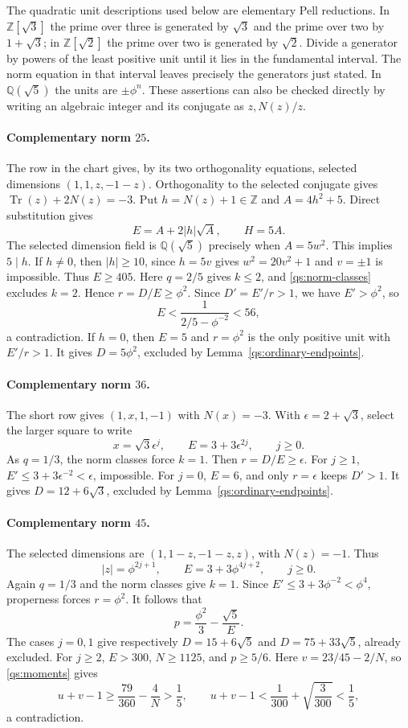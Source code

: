 \documentclass[11pt,a4paper]{article}
\theoremstyle{definition}\newtheorem{definition}[theorem]{Definition}
\theoremstyle{remark}\newtheorem{remark}[theorem]{Remark}
\newcommand{\Q}{\mathbb Q}
\newcommand{\ZZ}{\mathbb Z}
\numberwithin{equation}{section}
\begin{document}
The quadratic unit descriptions used below are elementary Pell
reductions. In $\ZZ[\sqrt3]$ the prime over three is generated by
$\sqrt3$ and the prime over two by $1+\sqrt3$; in
$\ZZ[\sqrt2]$ the prime over two is generated by $\sqrt2$.
Divide a generator by powers of the least positive unit until it lies
in the fundamental interval. The norm equation in that interval leaves
precisely the generators just stated. In $\Q(\sqrt5)$ the units
are $\pm\phi^n$. These assertions can also be checked directly by
writing an algebraic integer and its conjugate as $z,N(z)/z$.

\paragraph{Complementary norm $25$.}
The row in the chart gives, by its two orthogonality equations,
selected dimensions $(1,1,z,-1-z)$. Orthogonality to the selected
conjugate gives $\operatorname{Tr}(z)+2N(z)=-3$. Put
$h=N(z)+1\in\ZZ$ and $A=4h^2+5$. Direct substitution gives
\[
 E=A+2|h|\sqrt A,\qquad H=5A.
\]
The selected dimension field is $\Q(\sqrt5)$ precisely when
$A=5w^2$. This implies $5\mid h$. If $h\ne0$, then $|h|\ge10$,
since $h=5v$ gives $w^2=20v^2+1$ and $v=\pm1$ is impossible.
Thus $E\ge405$. Here $q=2/5$ gives $k\le2$, and
\eqref{qs:norm-classes} excludes $k=2$. Hence $r=D/E\ge\phi^2$.
Since $D'=E'/r>1$, we have $E'>\phi^2$, so
\[
 E<\frac1{2/5-\phi^{-2}}<56,
\]
a contradiction. If $h=0$, then $E=5$ and $r=\phi^2$ is the only
positive unit with $E'/r>1$. It gives $D=5\phi^2$, excluded by
Lemma~\ref{qs:ordinary-endpoints}.

\paragraph{Complementary norm $36$.}
The short row gives $(1,x,1,-1)$ with $N(x)=-3$.
With $\epsilon=2+\sqrt3$, select the larger square to write
\[
 x=\sqrt3\epsilon^j,\qquad E=3+3\epsilon^{2j},\qquad j\ge0.
\]
As $q=1/3$, the norm classes force $k=1$. Then $r=D/E\ge\epsilon$.
For $j\ge1$, $E'\le3+3\epsilon^{-2}<\epsilon$, impossible.
For $j=0$, $E=6$, and only $r=\epsilon$ keeps $D'>1$.
It gives $D=12+6\sqrt3$, excluded by Lemma~\ref{qs:ordinary-endpoints}.

\paragraph{Complementary norm $45$.}
The selected dimensions are $(1,1-z,-1-z,z)$, with $N(z)=-1$.
Thus
\[
 |z|=\phi^{2j+1},\qquad E=3+3\phi^{4j+2},\qquad j\ge0.
\]
Again $q=1/3$ and the norm classes give $k=1$.
Since $E'\le3+3\phi^{-2}<\phi^4$, properness forces $r=\phi^2$.
It follows that
\[
 p=\frac{\phi^2}{3}-\frac{\sqrt5}{E}.
\]
The cases $j=0,1$ give respectively $D=15+6\sqrt5$ and
$D=75+33\sqrt5$, already excluded. For $j\ge2$,
$E>300$, $N\ge1125$, and $p\ge5/6$. Here
$v=23/45-2/N$, so \eqref{qs:moments} gives
\[
 u+v-1\ge\frac{79}{360}-\frac4N>\frac15,
 \qquad
 u+v-1<\frac1{300}+\sqrt{\frac3{300}}<\frac15,
\]
a contradiction.
\end{document}
